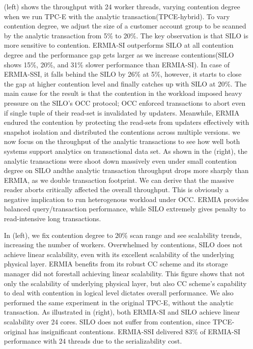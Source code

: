 (left) shows the throughput with 24 worker threads, varying contention degree when we run TPC-E with the analytic transaction(TPCE-hybrid). To vary contention degree, we adjust the size of a customer account group to be scanned by the analytic transaction from 5\% to 20\%. The key observation is that SILO is more sensitive to contention. ERMIA-SI outperforms SILO at all contention degree and the performance gap gets larger as we increase contentions(SILO shows 15\%, 20\%, and 31\% slower performance than ERMIA-SI). In case of ERMIA-SSI, it falls behind the SILO by 26\% at 5\%, however, it starts to close the gap at higher contention level and finally catches up with SILO at 20\%. 
The main cause for the result is that the contention in the workload imposed heavy pressure on the SILO's OCC protocol; OCC enforced transactions to abort even if single tuple of their read-set is invalidated by updaters. Meanwhile, ERMIA endured the contention by protecting the read-sets from updaters effectively with snapshot isolation and distributed the contentions across multiple versions. 
we now focus on the throughput of the analytic transactions to see how well both systems support analytics on transactional data set. As shown in the (right), the analytic transactions were shoot down massively even under small contention degree on SILO andthe analytic transaction throughput drops more sharply than ERMIA, as we double transaction footprint. We can derive that the massive reader aborts critically affected the overall throughput. This is obviously a negative implication to run heterogenous workload under OCC. ERMIA provides balanced query/transaction performance, while SILO extremely gives penalty to read-intensive long transactions. 

In (left), we fix contention degree to 20\% scan range and see scalability trends, increasing the number of workers. Overwhelmed by contentions, SILO does not achieve linear scalability, even with its excellent scalability of the underlying physical layer. ERMIA benefits from its robust CC scheme and its storage manager did not forestall achieving linear scalability. This figure shows that not only the scalability of underlying physical layer, but also CC scheme's capability to deal with contention in logical level dictates overall performance. We also performed the same experiment in the original TPC-E, without the analytic transaction. As illustrated in (right), both ERMIA-SI and SILO achieve linear scalability over 24 cores. SILO does not suffer from contention, since TPCE-original has insignificant contentions. ERMIA-SSI delivered 83\% of ERMIA-SI performance with 24 threads due to the serializability cost.

